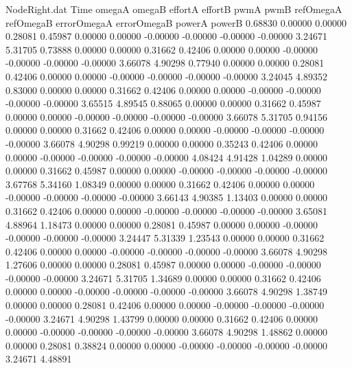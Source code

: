 \begin{filecontents}{NodeRight.dat}
Time omegaA omegaB effortA effortB pwmA pwmB refOmegaA refOmegaB errorOmegaA errorOmegaB powerA powerB
   0.68830    0.00000    0.00000     0.28081    0.45987    0.00000    0.00000   -0.00000   -0.00000   -0.00000   -0.00000    3.24671    5.31705
   0.73888    0.00000    0.00000     0.31662    0.42406    0.00000    0.00000   -0.00000   -0.00000   -0.00000   -0.00000    3.66078    4.90298
   0.77940    0.00000    0.00000     0.28081    0.42406    0.00000    0.00000   -0.00000   -0.00000   -0.00000   -0.00000    3.24045    4.89352
   0.83000    0.00000    0.00000     0.31662    0.42406    0.00000    0.00000   -0.00000   -0.00000   -0.00000   -0.00000    3.65515    4.89545
   0.88065    0.00000    0.00000     0.31662    0.45987    0.00000    0.00000   -0.00000   -0.00000   -0.00000   -0.00000    3.66078    5.31705
   0.94156    0.00000    0.00000     0.31662    0.42406    0.00000    0.00000   -0.00000   -0.00000   -0.00000   -0.00000    3.66078    4.90298
   0.99219    0.00000    0.00000     0.35243    0.42406    0.00000    0.00000   -0.00000   -0.00000   -0.00000   -0.00000    4.08424    4.91428
   1.04289    0.00000    0.00000     0.31662    0.45987    0.00000    0.00000   -0.00000   -0.00000   -0.00000   -0.00000    3.67768    5.34160
   1.08349    0.00000    0.00000     0.31662    0.42406    0.00000    0.00000   -0.00000   -0.00000   -0.00000   -0.00000    3.66143    4.90385
   1.13403    0.00000    0.00000     0.31662    0.42406    0.00000    0.00000   -0.00000   -0.00000   -0.00000   -0.00000    3.65081    4.88964
   1.18473    0.00000    0.00000     0.28081    0.45987    0.00000    0.00000   -0.00000   -0.00000   -0.00000   -0.00000    3.24447    5.31339
   1.23543    0.00000    0.00000     0.31662    0.42406    0.00000    0.00000   -0.00000   -0.00000   -0.00000   -0.00000    3.66078    4.90298
   1.27606    0.00000    0.00000     0.28081    0.45987    0.00000    0.00000   -0.00000   -0.00000   -0.00000   -0.00000    3.24671    5.31705
   1.34689    0.00000    0.00000     0.31662    0.42406    0.00000    0.00000   -0.00000   -0.00000   -0.00000   -0.00000    3.66078    4.90298
   1.38749    0.00000    0.00000     0.28081    0.42406    0.00000    0.00000   -0.00000   -0.00000   -0.00000   -0.00000    3.24671    4.90298
   1.43799    0.00000    0.00000     0.31662    0.42406    0.00000    0.00000   -0.00000   -0.00000   -0.00000   -0.00000    3.66078    4.90298
   1.48862    0.00000    0.00000     0.28081    0.38824    0.00000    0.00000   -0.00000   -0.00000   -0.00000   -0.00000    3.24671    4.48891

\end{filecontents}
